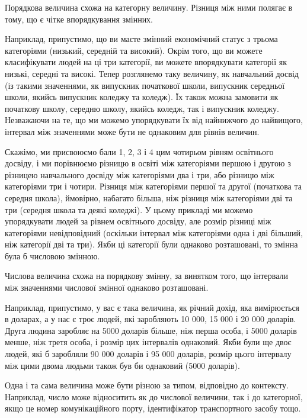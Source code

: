 \begin{ozn}
Порядкова величина схожа на категорну величину. Різниця між ними полягає в тому, що є чітке впорядкування змінних. 
\end{ozn}

Наприклад, припустимо, що ви маєте змінний економічний статус з трьома категоріями (низький, середній та високий). Окрім того, що ви можете класифікувати людей на ці три категорії, ви можете впорядкувати категорії як низькі, середні та високі. Тепер розглянемо таку величину, як навчальний досвід (із такими значеннями, як випускник початкової школи, випускник середньої школи, якийсь випускник коледжу та коледж). Їх також можна замовити як початкову школу, середню школу, якийсь коледж, так і випускник коледжу. Незважаючи на те, що ми можемо упорядкувати їх від найнижчого до найвищого, інтервал між значеннями може бути не однаковим для рівнів величин. 

Скажімо, ми присвоюємо бали 1, 2, 3 і 4 цим чотирьом рівням освітнього досвіду, і ми порівнюємо різницю в освіті між категоріями першою і другою з різницею навчального досвіду між категоріями два і три, або різницю між категоріями три і чотири. Різниця між категоріями першої та другої (початкова та середня школа), ймовірно, набагато більша, ніж різниця між категоріями дві та три (середня школа та деякі коледжі). У цьому прикладі ми можемо упорядкувати людей за рівнем освітнього досвіду, але розмір різниці між категоріями невідповідний (оскільки інтервал між категоріями одна і дві більший, ніж категорії дві та три). Якби ці категорії були однаково розташовані, то змінна була б числовою змінною.

\begin{ozn}
Числова величина схожа на порядкову змінну, за винятком того, що інтервали між значеннями числової змінної однаково розташовані. 
\end{ozn}

Наприклад, припустимо, у вас є така величина, як річний дохід, яка вимірюється в доларах, а у нас є троє людей, які заробляють 10 000, 15 000 і 20 000 доларів. Друга людина заробляє на 5000 доларів більше, ніж перша особа, і 5000 доларів менше, ніж третя особа, і розмір цих інтервалів однаковий. Якби були ще двоє людей, які б заробляли 90 000 доларів і 95 000 доларів, розмір цього інтервалу між цими двома людьми також був би однаковий (5000 доларів).

Одна і та сама величина може бути різною за типом, відповідно до контексту. Наприклад, число може відноситить як до числової величини, так і до категорної, якщо це номер комунікаційного порту, ідентифікатор транспортного засобу тощо.

